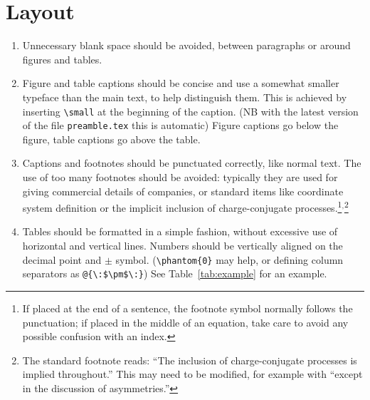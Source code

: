 \section{Layout}

\begin{enumerate}

\item Unnecessary blank space should be avoided, between paragraphs or
  around figures and tables.

\item Figure and table captions should be concise and use a somewhat smaller typeface
  than the main text, to help distinguish them. This is achieved by 
  inserting \verb!\small! at the beginning of the caption.
  (NB with the latest version of the file \verb!preamble.tex! this is automatic)
  Figure captions go below the figure, table captions go above the
  table.

\item Captions and footnotes should be punctuated correctly, like
  normal text. The use of too many footnotes should be avoided:
  typically they are used for giving commercial details of companies,
  or standard items like coordinate system definition or the implicit
  inclusion of charge-conjugate processes.\footnote{If placed at the end
    of a sentence, the footnote symbol normally follows the
    punctuation; if placed in the middle of an equation, take care to
    avoid any possible confusion with an index.}$^,$\footnote{The standard footnote reads: ``The inclusion of charge-conjugate processes is implied
    throughout.'' This may need to be modified, for example with ``except in the discussion of asymmetries.''}

\item Tables should be formatted in a simple fashion, without
  excessive use of horizontal and vertical lines.
  Numbers should be vertically aligned on the decimal point and $\pm$ symbol.
  (\verb!\phantom{0}! may help, or defining column separators as \verb!@{\:$\pm$\:}!)
  See Table~\ref{tab:example} for an example. 



\end{enumerate}
